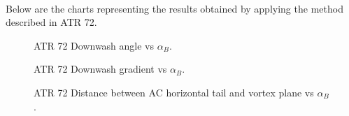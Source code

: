 \noindent \\

Below are the charts representing the results obtained by applying the method described in ATR 72.

\begin{figure}[H]
\centering

\caption{ATR 72 Downwash angle vs $\alpha_{B}$.}
\label{fig:epsilon}
\end{figure}

\begin{figure}[H]
\centering

\caption{ATR 72 Downwash gradient vs $\alpha_{B}$.}
\label{fig:ThrustDragATR}
\end{figure}

\begin{figure}[H]
\centering

\caption{ATR 72 Distance between AC horizontal tail and vortex plane vs $\alpha_{B}$.}
\label{fig:ThrustDragATR}
\end{figure}